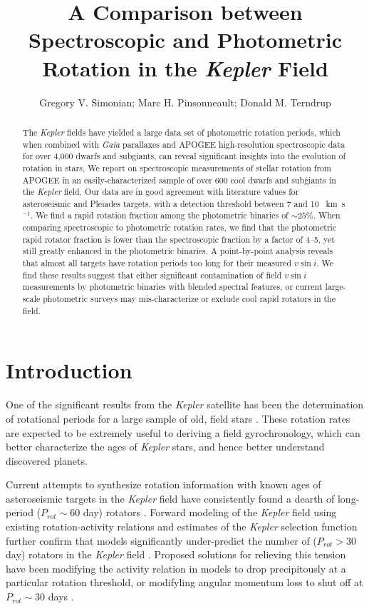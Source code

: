 \documentclass[manuscript]{aastex6}
\newcommand{\vsini}{\ensuremath{v \sin i}}
\newcommand{\Kepler}{\mbox{\textit{Kepler}}}
\newcommand{\Gaia}{\mbox{\textit{Gaia}}}
\newcommand{\kms}{\textrm{~km~s}\ensuremath{^{-1}}}
\begin{document}
\title{A Comparison between Spectroscopic and Photometric Rotation in the
\Kepler{} Field}
\author{Gregory V. Simonian; Marc H. Pinsonneault; Donald M. Terndrup}

\begin{abstract}
    The \Kepler{} fields have yielded a large data set of photometric rotation
    periods, which when combined with \Gaia{} parallaxes and APOGEE
    high-resolution spectroscopic data for over 4,000 dwarfs and subgiants, 
    can reveal significant insights into the evolution of rotation in stars, 
    We report on spectroscopic measurements of stellar rotation from APOGEE in an
    easily-characterized sample of over 600 cool dwarfs and subgiants in the
    \Kepler{} field. Our data are in good agreement with literature values for
    asteroseismic and Pleiades targets, with a detection threshold between 7 
    and 10 \kms. We find a rapid rotation fraction among the photometric
    binaries of \(\sim 25\%\). When comparing spectroscopic to photometric 
    rotation rates, we find that the photometric rapid rotator 
    fraction is lower than the spectroscopic fraction by a factor of 4--5, yet
    still greatly enhanced in the photometric binaries. A point-by-point 
    analysis reveals that almost all targets have rotation periods too long 
    for their measured \vsini{}. We find these results suggest that either 
    significant contamination of field \vsini{} measurements by photometric 
    binaries with blended spectral features, or current large-scale 
    photometric surveys may mis-characterize or exclude 
    cool rapid rotators in the field. 
\end{abstract}

\section{Introduction}

One of the significant results from the \Kepler{} satellite has been the
determination of rotational periods for a large sample of old, field stars
\citep{Basri11,Affer12,Nielsen13,Reinhold13,McQuillan14,Garcia14}.
These rotation rates are expected to be extremely useful to deriving a field
gyrochronology, which can better characterize the ages of
\Kepler{} stars, and hence better understand discovered planets.


Current attempts to synthesize rotation information with known ages of
asteroseismic targets in the \Kepler{} field have consistently found a dearth
of long-period (\(P_{rot} \sim 60\) day) rotators \citep{Angus15,vanSaders16}. 
Forward modeling of the \Kepler{} field using existing rotation-activity
relations and estimates of the \Kepler{} selection function further confirm 
that models significantly under-predict the number of (\(P_{rot} > 30\) day) 
rotators in the \Kepler{} field \citep{vanSaders18}. Proposed solutions for 
relieving this tension have been modifying the activity relation in models to 
drop precipitously at a particular rotation threshold, or modifyling angular 
momentum loss to shut off at \(P_{rot} \sim 30\) days \citep{vanSaders18}.
\end{document}
